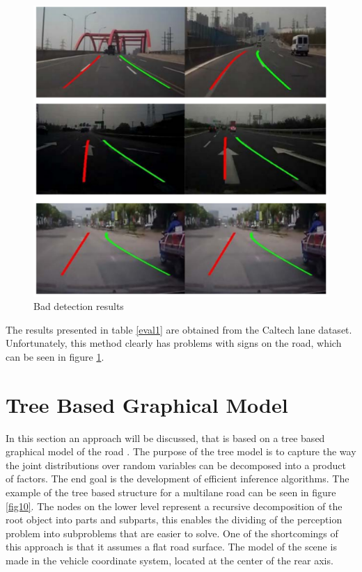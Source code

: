 \begin{figure}[H]
	\centering
    \includegraphics[scale = 0.5]{pictures/bad_detections.pdf}
	\caption{Bad detection results \cite{ransac}}
	\label{fig6}
\end{figure}



The results presented in table \ref{eval1} are obtained from the Caltech lane dataset. Unfortunately, this method clearly has problems with signs on the road, which can be seen in figure \ref{fig6}.

\pagebreak

\section{Tree Based Graphical Model}


In this section an approach will be discussed, that is based on a tree based graphical model of the road \cite{lanesystem}. The purpose of the tree model is to capture the way the joint distributions over random variables can be decomposed into a product of factors. The end goal is the development of efficient inference algorithms. The example of the tree based structure for a multilane road can be seen in figure \ref{fig10}.
The nodes on the lower level represent a recursive decomposition of the root object into parts and subparts, this enables the dividing of the perception problem into subproblems that are easier to solve. One of the shortcomings of this approach is that it assumes a flat road surface. The model of the scene is 
made in the vehicle coordinate system, located at the center of the rear axis. 


